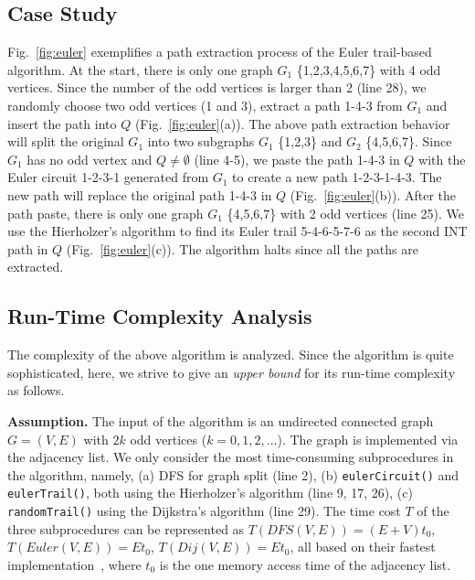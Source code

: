 \subsection{Case Study}
Fig.~\ref{fig:euler} exemplifies a path extraction process of the Euler trail-based algorithm. At the start, there is only one graph $G_1$ \{1,2,3,4,5,6,7\} with 4 odd vertices. Since the number of the odd vertices is larger than 2 (line 28), we randomly choose two odd vertices (1 and 3), extract a path 1-4-3 from $G_1$ and insert the path into $Q$ (Fig.~\ref{fig:euler}(a)). The above path extraction behavior will split the original $G_1$ into two subgraphs $G_1$ \{1,2,3\} and $G_2$ \{4,5,6,7\}. Since $G_1$ has no odd vertex and $Q \neq \emptyset$ (line 4-5), we paste the path 1-4-3 in $Q$ with the Euler circuit 1-2-3-1 generated from $G_1$ to create a new path 1-2-3-1-4-3. The new path will replace the original path 1-4-3 in $Q$ (Fig.~\ref{fig:euler}(b)). After the path paste, there is only one graph $G_1$ \{4,5,6,7\} with 2 odd vertices (line 25). We use the Hierholzer's algorithm to find its Euler trail 5-4-6-5-7-6 as the second INT path in $Q$ (Fig.~\ref{fig:euler}(c)). The algorithm halts since all the paths are extracted.

\subsection{Run-Time Complexity Analysis}
\label{subsec:theory}

The complexity of the above algorithm is analyzed. Since the algorithm is quite sophisticated, here, we strive to give an \emph{upper bound} for its run-time complexity as follows.

\textbf{Assumption.}
The input of the algorithm is an undirected connected graph $G=(V,E)$ with $2k$ odd vertices ($k = 0,1,2,...$). The graph is implemented via the adjacency list. We only consider the most time-consuming subprocedures in the algorithm, namely, (a) DFS for graph split (line 2), (b) \texttt{eulerCircuit()} and \texttt{eulerTrail()}, both using the Hierholzer's algorithm (line 9, 17, 26), (c) \texttt{randomTrail()} using the Dijkstra's algorithm (line 29). The time cost $T$ of the three subprocedures can be represented as $T(DFS(V,E)) = (E+V)t_0$, $T(Euler(V,E)) = Et_0$, $T(Dij(V,E)) = Et_0$, all based on their fastest implementation~\cite{cormen2009introduction, hierholzer1873moglichkeit, thorup1999undirected}, where $t_0$ is the one memory access time of the adjacency list.

